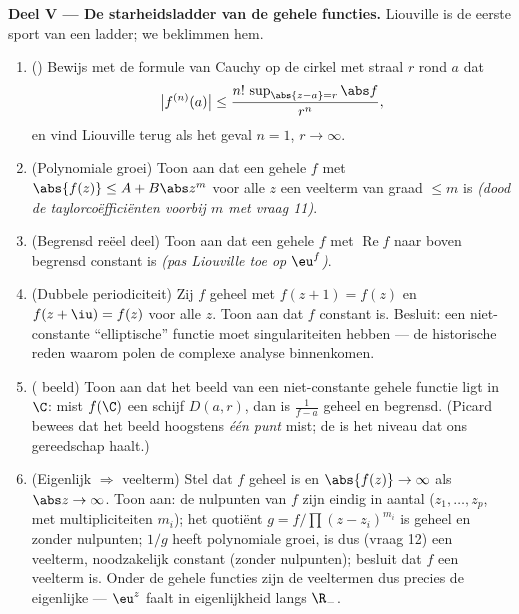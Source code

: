 \begin{problem}
\medskip
\noindent\textbf{Deel V --- De starheidsladder van de gehele
functies.} Liouville is de eerste sport van een ladder; we
beklimmen hem.
\begin{enumerate}[resume]
  \item () Bewijs met de formule van
        Cauchy op de cirkel met straal $r$ rond $a$ dat
        \[
        \bigl|f^{(n)}(a)\bigr| \leq
        \frac{n!\,\sup_{\abs{z-a}=r}\abs f}{r^n} ,
        \]
        en vind Liouville terug als het geval $n = 1$, $r \to
        \infty$.
  \item (Polynomiale groei) Toon aan dat een gehele $f$ met
        $\abs{f(z)} \leq A + B\abs z^m$ voor alle $z$ een
        veelterm van graad $\leq m$ is \emph{(dood de
        taylorcoëfficiënten voorbij $m$ met vraag 11)}.
  \item (Begrensd reëel deel) Toon aan dat een gehele $f$ met
        $\operatorname{Re}f$ naar boven begrensd constant is
        \emph{(pas Liouville toe op $\eu^{f}$)}.
  \item (Dubbele periodiciteit) Zij $f$ geheel met $f(z + 1) =
        f(z)$ en $f(z + \iu) = f(z)$ voor alle $z$. Toon aan dat
        $f$ constant is. Besluit: een niet-constante
        ``elliptische'' functie moet singulariteiten hebben ---
        de historische reden waarom polen de complexe analyse
        binnenkomen.
  \item ( beeld) Toon aan dat het beeld van een
        niet-constante gehele functie  ligt in $\C$: mist
        $f(\C)$ een schijf $D(a, r)$, dan is $\frac1{f - a}$
        geheel en begrensd. (Picard bewees dat het beeld hoogstens
        \emph{één punt} mist; de  is het niveau dat ons
        gereedschap haalt.)
  \item (Eigenlijk $\Rightarrow$ veelterm) Stel dat $f$ geheel is
        en $\abs{f(z)} \to \infty$ als $\abs z \to \infty$. Toon
        aan: de nulpunten van $f$ zijn eindig in aantal ($z_1,
        \dots, z_p$, met multipliciteiten $m_i$); het quotiënt $g
        = f/\prod(z - z_i)^{m_i}$ is geheel en zonder nulpunten;
        $1/g$ heeft polynomiale groei, is dus (vraag 12) een
        veelterm, noodzakelijk constant (zonder nulpunten);
        besluit dat $f$ een veelterm is. Onder de gehele functies
        zijn de veeltermen dus precies de eigenlijke --- $\eu^z$
        faalt in eigenlijkheid langs $\R_-$.
\end{enumerate}


\end{problem}
